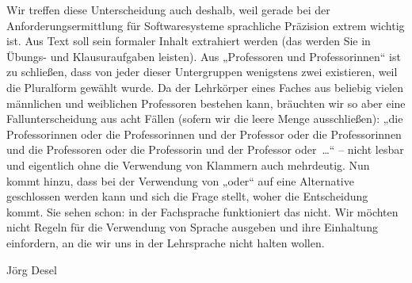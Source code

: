 Wir treffen diese Unterscheidung auch deshalb, weil gerade bei der Anforderungsermittlung für Softwaresysteme sprachliche Präzision extrem wichtig ist. Aus Text soll sein formaler Inhalt extrahiert werden (das werden Sie in Übungs- und Klausur\-aufgaben leisten). Aus „Professoren und Professorinnen“ ist zu schließen, dass von jeder dieser Untergruppen wenigstens zwei existieren, weil die Pluralform gewählt wurde. Da der Lehrkörper eines Faches aus beliebig vielen männlichen und weiblichen Professoren bestehen kann, bräuchten wir so aber eine Fallunterscheidung aus acht Fällen (sofern wir die leere Menge ausschließen): „die Professorinnen oder die Professorinnen und der Professor oder die Professorinnen und die Professoren oder die Professorin und der Professor oder~\ldots“ – nicht lesbar und eigentlich ohne die Verwendung von Klammern auch mehrdeutig. Nun kommt hinzu, dass bei der Verwendung von „oder“ auf eine Alternative geschlossen werden kann und sich die Frage stellt, woher die Entscheidung kommt. Sie sehen schon: in der Fachsprache funktioniert das nicht. Wir möchten nicht Regeln für die Verwendung von Sprache ausgeben und ihre Einhaltung einfordern, an die wir uns in der Lehrsprache nicht halten wollen.

Jörg Desel